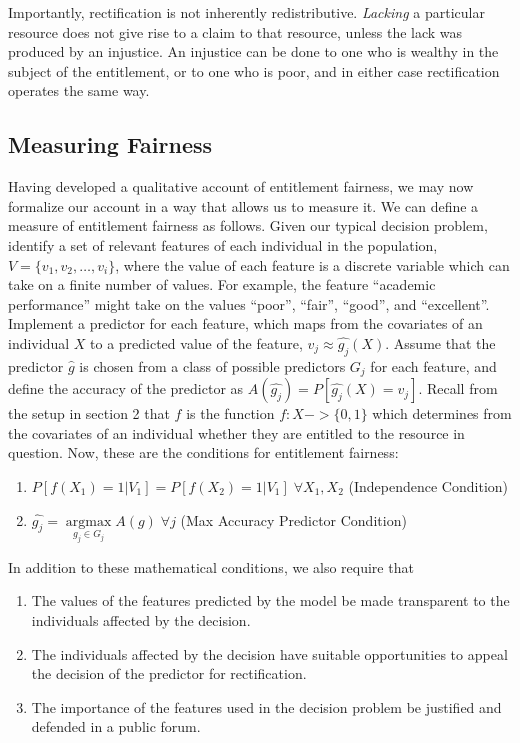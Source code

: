 Importantly, rectification is not inherently redistributive. \emph{Lacking} a 
particular resource does not give rise to a claim to that resource, unless the
lack was produced by an injustice. An injustice can be done to one who is
wealthy in the subject of the entitlement, or to one who is poor, and in either
case rectification operates the same way.

\subsection{Measuring Fairness}

Having developed a qualitative account of entitlement fairness, we may now
formalize our account in a way that allows us to measure it. We can
define a measure of entitlement fairness as follows. Given our typical decision
problem, identify a set of relevant features of each individual in the
population, $V = \{v_1, v_2, \ldots, v_i\}$, where the value of each feature is
a discrete variable which can take on a finite number of values. For example, 
the feature ``academic performance'' might take on the values ``poor'', ``fair'',
``good'', and ``excellent''. Implement a predictor for each feature, which maps
from the covariates of an individual $X$ to a predicted value of the feature,
$v_j \approx \hat{g_j}(X)$. Assume that the predictor $\hat{g}$ is chosen from a
class of possible predictors $G_j$ for each feature, and define the accuracy of
the predictor as $A(\hat{g_j}) = P[\hat{g_j}(X) = v_j]$. Recall from the setup
in section 2 that $f$ is the function $f: X -> \{0, 1\}$ which determines from
the covariates of an individual whether they are entitled to the resource in
question. Now, these are the conditions for entitlement fairness:
\begin{enumerate}
    \item $P[f(X_1) = 1 | V_1] = P[f(X_2) = 1 | V_1]\;\forall X_1, X_2$ (Independence Condition)
    \item $\hat{g_j} = \mathop{\arg\max}\limits_{g_j\in G_j}A(g)\; \forall j$ (Max Accuracy Predictor Condition)
\end{enumerate}
In addition to these mathematical conditions, we also require that
\begin{enumerate}
    \item The values of the features predicted by the model be made
    transparent to the individuals affected by the decision.
    \item The individuals affected by the decision have suitable opportunities
    to appeal the decision of the predictor for rectification.
    \item The importance of the features used in the decision problem be 
    justified and defended in a public forum. 
\end{enumerate}


